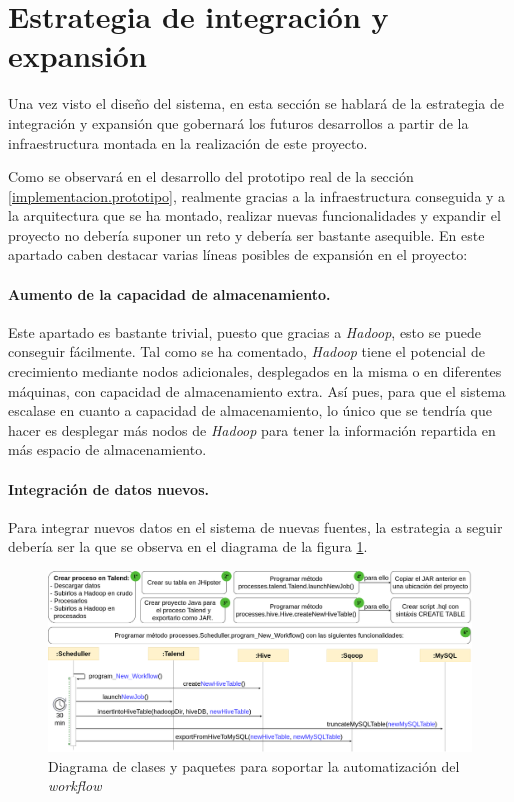 \section{Estrategia de integración y expansión}
\label{disenyo.estrategia}

Una vez visto el diseño del sistema, en esta sección se hablará de la estrategia de integración y expansión que gobernará los futuros desarrollos a partir de la infraestructura montada en la realización de este proyecto. 

Como se observará en el desarrollo del prototipo real de la sección \ref{implementacion.prototipo}, realmente gracias a la infraestructura conseguida y a la arquitectura que se ha montado, realizar nuevas funcionalidades y expandir el proyecto no debería suponer un reto y debería ser bastante asequible. En este apartado caben destacar varias líneas posibles de expansión en el proyecto: 

\paragraph*{Aumento de la capacidad de almacenamiento.} Este apartado es bastante trivial, puesto que gracias a \textit{Hadoop}, esto se puede conseguir fácilmente. Tal como se ha comentado, \textit{Hadoop} tiene el potencial de crecimiento mediante nodos adicionales, desplegados en la misma o en diferentes máquinas, con capacidad de almacenamiento extra. Así pues, para que el sistema escalase en cuanto a capacidad de almacenamiento, lo único que se tendría que hacer es desplegar más nodos de \textit{Hadoop} para tener la información repartida en más espacio de almacenamiento. 

\paragraph*{Integración de datos nuevos.} Para integrar nuevos datos en el sistema de nuevas fuentes, la estrategia a seguir debería ser la que se observa en el diagrama de la figura \ref{fig:expansion}.

\begin{figure}[H]
    \centering
    \includegraphics[width=\textwidth,height=\textheight,keepaspectratio]{Imagenes/expansion}
    \caption{Diagrama de clases y paquetes para soportar la automatización del \textit{workflow}}
    \label{fig:expansion}
\end{figure}

